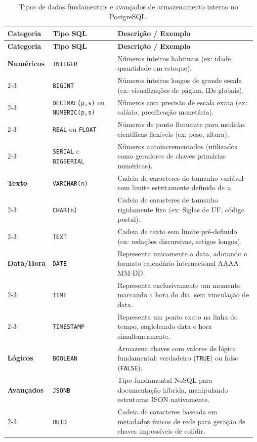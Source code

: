 \begin{longtable}{|l|p{4.2cm}|p{8.5cm}|}

\caption{Tipos de dados fundamentais e avançados de armazenamento interno no PostgreSQL.}
\label{tab:tipos_dados} \\

\hline
\textbf{Categoria} & \textbf{Tipo SQL} & \textbf{Descrição / Exemplo} \\ \hline
\endfirsthead

\textbf{Categoria} & \textbf{Tipo SQL} & \textbf{Descrição / Exemplo} \\ \hline
\endhead

\hline
\endfoot

\hline
\endlastfoot

\textbf{Numéricos} & \texttt{INTEGER} & Números inteiros habituais (ex: idade, quantidade em estoque). \\ \cline{2-3} 
 & \texttt{BIGINT} & Números inteiros longos de grande escala (ex: visualizações de página, IDs globais). \\ \cline{2-3}
 & \texttt{DECIMAL(p,s)} ou \newline \texttt{NUMERIC(p,s)} & Números com precisão de escala exata (ex: salário, precificação monetária). \\ \cline{2-3} 
 & \texttt{REAL} ou \texttt{FLOAT} & Números de ponto flutuante para medidas científicas flexíveis (ex: peso, altura). \\ \cline{2-3} 
 & \texttt{SERIAL} e \texttt{BIGSERIAL} & Números autoincrementados (utilizados como geradores de chaves primárias numéricas). \\ \hline
\textbf{Texto} & \texttt{VARCHAR(n)} & Cadeia de caracteres de tamanho variável com limite estritamente definido de $n$. \\ \cline{2-3} 
 & \texttt{CHAR(n)} & Cadeia de caracteres de tamanho rigidamente fixo (ex: Siglas de UF, código postal). \\ \cline{2-3} 
 & \texttt{TEXT} & Cadeia de texto sem limite pré-definido (ex: redações discursivas, artigos longos). \\ \hline
\textbf{Data/Hora} & \texttt{DATE} & Representa unicamente a data, adotando o formato calendário internacional AAAA-MM-DD. \\ \cline{2-3} 
 & \texttt{TIME} & Representa exclusivamente um momento marcando a hora do dia, sem vinculação de data. \\ \cline{2-3}
 & \texttt{TIMESTAMP} & Representa um ponto exato na linha do tempo, englobando data e hora simultaneamente. \\ \hline
\textbf{Lógicos} & \texttt{BOOLEAN} & Armazena chaves com valores de lógica fundamental: verdadeiro (\texttt{TRUE}) ou falso (\texttt{FALSE}). \\ \hline
\textbf{Avançados} & \texttt{JSONB} & Tipo fundamental NoSQL para documentação híbrida, manipulando estruturas JSON nativamente. \\ \cline{2-3}
 & \texttt{UUID} & Cadeia de caracteres baseada em metadados únicos de rede para geração de chaves impossíveis de colidir. \\ \hline
\end{longtable}

